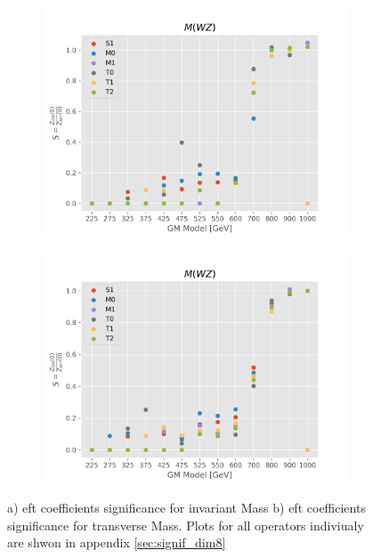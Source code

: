\documentclass[../Bachelorarbeit.tex]{subfiles}
\begin{document}
\begin{figure}[h]
    \centering
    \begin{subfigure}{0.45\textwidth}
        \includegraphics[width=\textwidth]{Plots/gm_relevanze/MWZ_all.png}
        \caption{}
    \end{subfigure}
    \begin{subfigure}{0.45\textwidth}
        \includegraphics[width=\textwidth]{Plots/gm_relevanze/MTWZ_all.png}
        \caption{}
    \end{subfigure}
    \caption{a) \acrshort{eft} coefficients significance for invariant Mass b) \acrshort{eft} coefficients significance for transverse Mass. Plots for all operators indiviualy are shwon in appendix \ref{sec:signif_dim8}}
    \label{fig:significans_plots}
\end{figure}
\end{document}

